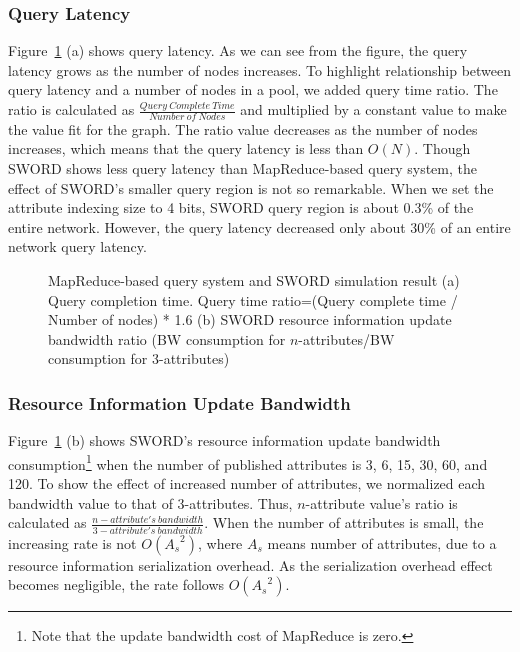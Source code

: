 \documentclass{acm_proc_article-sp}
\begin{document}
\subsubsection{Query Latency}
Figure~\ref{fig:sim} (a) shows query latency. As we can see from the figure, the query latency grows as the number of nodes increases. To highlight relationship between query latency and a number of nodes in a pool,
we added query time ratio. The ratio is calculated as \begin{math}\frac{Query\ Complete\ Time}{Number\ of\ Nodes}\end{math} and multiplied by a constant value to make the value fit for the graph.
The ratio value decreases as the number of nodes increases, which means that the query latency is less than $O(N)$.
Though SWORD shows less query latency than MapReduce-based query system, the effect of SWORD's smaller query region is not so remarkable. 
When we set the attribute indexing size to 4 bits, SWORD query region is about 0.3\% of the entire network. 
However, the query latency decreased only about 30\% of an entire network query latency.
\begin{figure}[t]
\centering
{}
\caption{\label{fig:sim}MapReduce-based query system and SWORD simulation result (a) Query completion time. Query time ratio=(Query complete time / Number of nodes) * 1.6
(b) SWORD resource information update bandwidth ratio (BW consumption for $n$-attributes/BW consumption for 3-attributes)}
\end{figure}
\subsubsection{Resource Information Update Bandwidth}
Figure~\ref{fig:sim} (b) shows SWORD's resource information update bandwidth consumption\footnote{Note that the update bandwidth cost of MapReduce is zero.}  when the number of published attributes is 3, 6, 15, 30, 60, and 120. 
To show the effect of increased number of attributes, we normalized each bandwidth value to that of 3-attributes.
Thus, $n$-attribute value's ratio is calculated as \begin{math}\frac{n-attribute's\ bandwidth}{3-attribute's\ bandwidth}\end{math}. 
When the number of attributes is small, the increasing rate is not $O({A_s}^2)$, where ${A_s}$ means number of attributes, due to a resource information serialization overhead.
As the serialization overhead effect becomes negligible, the rate follows $O({A_s}^2)$. 
\end{document}
